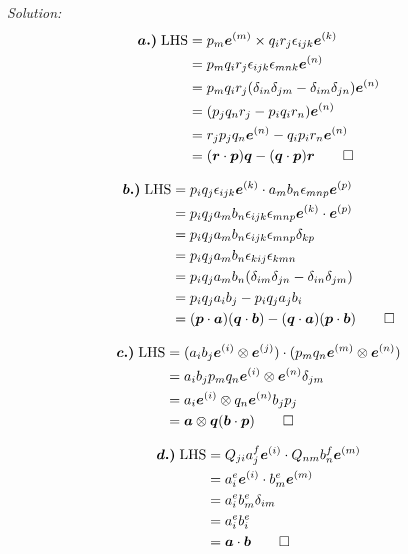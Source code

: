 \textit{Solution:}
\begin{align*}
\bm{a.)}\; \text{LHS} &= p_m \bm{e}^{(m)} \times q_i r_j \epsilon_{ijk} \bm{e}^{(k)} \\
 &= p_m q_i r_j \epsilon_{ijk} \epsilon_{mnk} \bm{e}^{(n)} \\
 &= p_m q_i r_j (\delta_{in} \delta_{jm} - \delta_{im} \delta_{jn})\bm{e}^{(n)} \\
 &= (p_j q_n r_j - p_i q_i r_n) \bm{e}^{(n)} \\
 &= r_j p_j q_n \bm{e}^{(n)} - q_i p_i r_n \bm{e}^{(n)} \\ 
 &= (\bm{r} \cdot \bm{p}) \bm{q} - (\bm{q} \cdot \bm{p}) \bm{r} \qed \\
\end{align*}

\begin{align*}
\bm{b.)}\; \text{LHS} &= p_i q_j \epsilon_{ijk} \bm{e}^{(k)} \cdot a_m b_n \epsilon_{mnp} \bm{e}^{(p)} \\
&= p_i q_j a_m b_n \epsilon_{ijk} \epsilon_{mnp} \bm{e}^{(k)} \cdot \bm{e}^{(p)} \\
&= p_i q_j a_m b_n \epsilon_{ijk} \epsilon_{mnp} \delta_{kp} \\
&= p_i q_j a_m b_n \epsilon_{kij} \epsilon_{kmn} \\ 
&= p_i q_j a_m b_n (\delta_{im} \delta_{jn} - \delta_{in} \delta_{jm}) \\
&= p_i q_j a_i b_j - p_i q_j a_j b_i \\
&= (\bm{p} \cdot \bm{a})(\bm{q} \cdot \bm{b}) - (\bm{q} \cdot \bm{a}) (\bm{p} \cdot \bm{b}) \qed \\
\end{align*}

\begin{align*}
\bm{c.)}\; \text{LHS} &= (a_i b_j \bm{e}^{(i)} \otimes \bm{e}^{(j)}) \cdot (p_m q_n \bm{e}^{(m)} \otimes \bm{e}^{(n)}) \\
&= a_i b_j p_m q_n \bm{e}^{(i)} \otimes \bm{e}^{(n)} \delta_{jm} \\
&= a_i \bm{e}^{(i)} \otimes q_n \bm{e}^{(n)} b_jp_j \\
&= \bm{a} \otimes \bm{q} (\bm{b} \cdot \bm{p}) \qed\\
\end{align*}

\begin{align*}
\bm{d.)}\; \text{LHS} &= Q_{ji} a_j^f \bm{e}^{(i)} \cdot Q_{nm} b_n^f \bm{e}^{(m)} \\
&= a_i^e \bm{e}^{(i)} \cdot b_m^e \bm{e}^{(m)} \\
&= a_i^e b_m^e \delta_{im} \\
&= a_i^e b_i^e \\
&= \bm{a} \cdot \bm{b} \qed
\end{align*}

